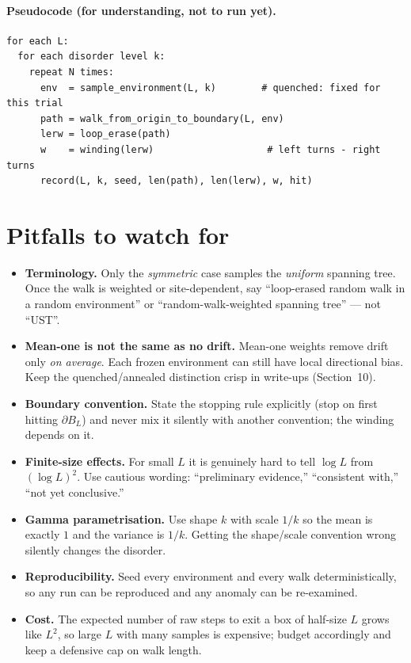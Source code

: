 \documentclass[11pt]{article}
\theoremstyle{definition}
\theoremstyle{plain}
\newcommand{\BL}{B_{L}}
\begin{document}
\paragraph{Pseudocode (for understanding, not to run yet).}
\begin{verbatim}
for each L:
  for each disorder level k:
    repeat N times:
      env  = sample_environment(L, k)        # quenched: fixed for this trial
      path = walk_from_origin_to_boundary(L, env)
      lerw = loop_erase(path)
      w    = winding(lerw)                    # left turns - right turns
      record(L, k, seed, len(path), len(lerw), w, hit)
\end{verbatim}

\section{Pitfalls to watch for}

\begin{itemize}[leftmargin=1.5em,itemsep=3pt]
  \item \textbf{Terminology.} Only the \emph{symmetric} case samples the
        \emph{uniform} spanning tree. Once the walk is weighted or
        site-dependent, say ``loop-erased random walk in a random environment''
        or ``random-walk-weighted spanning tree'' --- not ``UST''.
  \item \textbf{Mean-one is not the same as no drift.} Mean-one weights remove
        drift only \emph{on average}. Each frozen environment can still have
        local directional bias. Keep the quenched/annealed distinction crisp in
        write-ups (Section~10).
  \item \textbf{Boundary convention.} State the stopping rule explicitly (stop
        on first hitting $\partial\BL$) and never mix it silently with another
        convention; the winding depends on it.
  \item \textbf{Finite-size effects.} For small $L$ it is genuinely hard to tell
        $\log L$ from $(\log L)^2$. Use cautious wording: ``preliminary
        evidence,'' ``consistent with,'' ``not yet conclusive.''
  \item \textbf{Gamma parametrisation.} Use shape $k$ with scale $1/k$ so the
        mean is exactly $1$ and the variance is $1/k$. Getting the
        shape/scale convention wrong silently changes the disorder.
  \item \textbf{Reproducibility.} Seed every environment and every walk
        deterministically, so any run can be reproduced and any anomaly can be
        re-examined.
  \item \textbf{Cost.} The expected number of raw steps to exit a box of
        half-size $L$ grows like $L^2$, so large $L$ with many samples is
        expensive; budget accordingly and keep a defensive cap on walk length.
\end{itemize}
\end{document}

